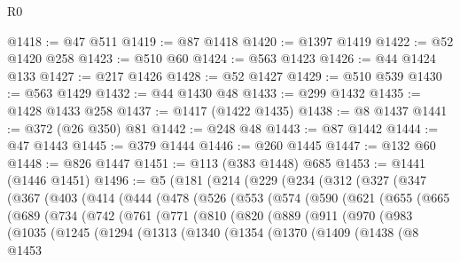 \begin{lexlean}{R0}
\begin{coremodule}
{{{{{{{{{{{{{{{{{{{{{{{{{{{{{{{{{{{{{{{{{{{{{{{{{{{{{{{{{{{{{{{{{{{{{{{{{@1418 := @47 @511
@1419 := @87 @1418
@1420 := @1397 @1419
@1422 := @52 @1420 @258
@1423 := @510 @60
@1424 := @563 @1423
@1426 := @44 @1424 @133
@1427 := @217 @1426
@1428 := @52 @1427
@1429 := @510 @539
@1430 := @563 @1429
@1432 := @44 @1430 @48
@1433 := @299 @1432
@1435 := @1428 @1433 @258
@1437 := @1417 (@1422 @1435)
@1438 := @8 @1437
@1441 := @372 (@26 @350) @81
@1442 := @248 @48
@1443 := @87 @1442
@1444 := @47 @1443
@1445 := @379 @1444
@1446 := @260 @1445
@1447 := @132 @60
@1448 := @826 @1447
@1451 := @113 (@383 @1448) @685
@1453 := @1441 (@1446 @1451)
@1496 := @5
    (@181
      (@214
        (@229
          (@234
            (@312
              (@327
                (@347
                  (@367
                    (@403
                      (@414
                        (@444
                          (@478
                            (@526
                              (@553
                                (@574
                                  (@590
                                    (@621
                                      (@655
                                        (@665
                                          (@689
                                            (@734
                                              (@742
                                                (@761
                                                  (@771
                                                    (@810
                                                      (@820
                                                        (@889
                                                          (@911
                                                            (@970
                                                              (@983
                                                                (@1035
                                                                  (@1245
                                                                    (@1294
                                                                      (@1313
                                                                        (@1340
                                                                          (@1354
                                                                            (@1370
                                                                              (@1409
                                                                                (@1438
                                                                                  (@8
                                                                                    @1453
}}}}}}}}}}}}}}}}}}}}}}}}}}}}}}}}}}}}}}}}}}}}}}}}}}}}}}}}}}}}}}}}}}}}}}}}}
\end{coremodule}
\end{lexlean}
